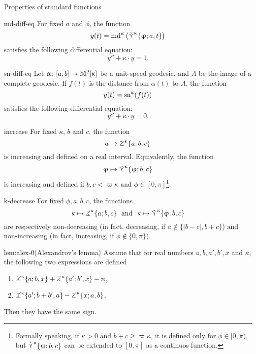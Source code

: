 \begin{thm}{Properties of standard functions}\label{md-equalities}

\begin{subthm}{md-diff-eq}
For fixed $a$ and $\phi$, the function 
\[y(t)=\mathrm{md}^{\upkappa}\left(\mathop{\tilde\curlyvee}\nolimits^{\upkappa}\{\upvarphi;a,t\}\right)\]
 satisfies the following differential equation:
\[y''+\kappa\cdot y=1.\]
\end{subthm}

\begin{subthm}{sn-diff-eq}
Let $\alpha\:[a,b]\to\Lob2\kappa$ be a unit-speed geodesic, and $A$ be the image of a complete geodesic.  If $f(t)$ is the distance from $\alpha(t)$ to $A$, the function 
\[y(t)=\mathrm{sn}^{\upkappa} (f(t))\]
 satisfies the following differential equation:
\[y''+\kappa\cdot y=0.\]
\end{subthm}

\begin{subthm}{increase}
For fixed $\kappa$, $b$ and $c$, the function 
\[a\mapsto\tangle\mc\kappa\{a;b,c\}\]
is increasing and defined on a real interval.
Equivalently, the function
\[\phi\mapsto\side\kappa \{\phi;b,c\}\]
is increasing and defined if $b,c<\varpi\kappa$ and $\phi\in[0,\pi]$\footnote{Formally speaking, if $\kappa>0$ and $b+c\ge \varpi\kappa$, it is defined only for $\phi\in[0,\pi)$, but $\mathop{\tilde\curlyvee}\nolimits^{\upkappa} \{\upvarphi;b,c\}$ can be extended to $[0,\pi]$ as a continuos function.}.
\end{subthm}

\begin{subthm}{k-decrease}
For fixed $\phi,a,b,c$, the functions
\[\kappa\mapsto \tangle\mc\kappa\{a;b,c\}\ \ \text{and}\ \ \kappa\mapsto \side\kappa \{\phi;b,c\}\]
are respectively non-decreasing (in fact, decreasing, if $a\notin\{|b-c|, b+c\}$) and non-increasing (in fact, increasing, if $\phi\notin\{0,\pi\}$).
\end{subthm}

\begin{subthm}{lem:alex-0}(Alexandrov's lemma)
Assume that for real numbers $a,b,a',b', x$ and $\kappa$, the following two expressions are defined
\begin{enumerate}
\item $\tangle\mc\kappa\{a;b,x\}+\tangle\mc\kappa\{a';b',x\}-\pi$,
\item $\tangle\mc\kappa\{a';b+b',a\}-\tangle\mc\kappa\{x;a,b\}$,
\end{enumerate}
Then they have the same sign.
\end{subthm}
\end{thm}



